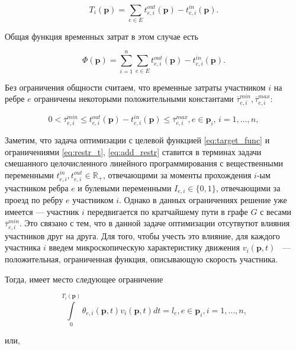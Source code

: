 \documentclass[12pt, a4paper]{article}
\begin{document}
\begin{equation}
	\label{eq:T_i_by_t}
	T_i(\textbf{p}) = \sum \limits_{e \in E} t_{e, i}^{out}(\textbf{p}) - t_{e, i}^{in}(\textbf{p}).
\end{equation}

Общая функция временных затрат в этом случае есть 

\begin{equation}
	\label{eq:target_func}
	\Phi(\textbf{p}) =\sum \limits_{i = 1}^n \sum \limits_{e \in E} t_{e, i}^{out}(\textbf{p}) - t_{e, i}^{in}(\textbf{p}).
\end{equation}

Без ограничения общности считаем, что временные затраты участником $i$ на ребре $e$ ограничены некоторыми положительными константами $\overline{\tau}_{e, i}^{min}, \overline{\tau}_{e, i}^{max}$:

\begin{equation}
	\label{eq:add_restr}
		0 < \overline{\tau}_{e, i}^{min} \le t_{e, i}^{out}(\textbf{p}) - t_{e, i}^{in}(\textbf{p}) \le \overline{\tau}_{e, i}^{max}, e \in \textbf{p}_i,\, i = 1, \dots, n,
\end{equation}

Заметим, что задача оптимизации с целевой функцией \eqref{eq:target_func} и ограничениями \eqref{eq:restr_t}, \eqref{eq:add_restr} ставится в терминах задачи смешанного целочисленного линейного программирования с вещественными переменными $t_{e, i}^{in}, t_{e, i}^{out} \in \mathbb{R}_+$, отвечающими за моменты прохождения $i$-ым участником ребра $e$ и булевыми переменными $I_{e, i} \in \{0, 1\}$, отвечающими за проезд по ребру $e$ участником $i$. Однако в данных ограничениях решение уже имеется --- участник $i$ передвигается по кратчайшему пути в графе $G$ с весами $\overline{\tau}_{e, i}^{min}$. Это связано с тем, что в данной задаче оптимизации отсутвутют влияния участников друг на друга. Для того, чтобы учесть это влияние, для каждого участника $i$ введем микроскопическую характеристику движения $v_i(\textbf{p}, t)$ ~--- положительная, ограниченная функция, описывающую скорость участника.


Тогда, имеет место следующее ограничение

\begin{equation}
	\label{eq:velocity_eq_by_theta}
	\int\limits_{0}^{T_i(\textbf{p})} \theta_{e, i} (\textbf{p}, t) v_i(\textbf{p}, t) dt = l_e, e \in \textbf{p}_i, i = 1, \dots, n,
\end{equation}

или,
\end{document}

